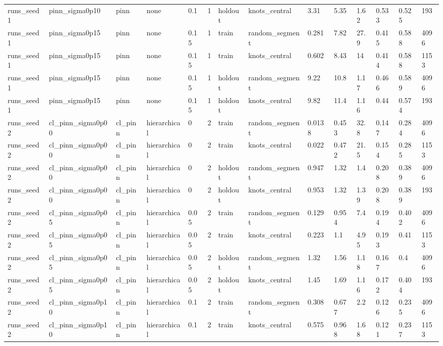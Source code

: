 \begin{table}[t]
\begin{tabular}{llllllllllllll}
runs\_seed1 & pinn\_sigma0p10 & pinn & none & 0.1 & 1 & holdout & knots\_central & 3.31 & 5.35 & 1.62 & 0.533 & 0.525 & 193 \\
runs\_seed1 & pinn\_sigma0p15 & pinn & none & 0.15 & 1 & train & random\_segment & 0.281 & 7.82 & 27.9 & 0.415 & 0.588 & 4096 \\
runs\_seed1 & pinn\_sigma0p15 & pinn & none & 0.15 & 1 & train & knots\_central & 0.602 & 8.43 & 14 & 0.414 & 0.588 & 1153 \\
runs\_seed1 & pinn\_sigma0p15 & pinn & none & 0.15 & 1 & holdout & random\_segment & 9.22 & 10.8 & 1.17 & 0.466 & 0.589 & 4096 \\
runs\_seed1 & pinn\_sigma0p15 & pinn & none & 0.15 & 1 & holdout & knots\_central & 9.82 & 11.4 & 1.16 & 0.44 & 0.574 & 193 \\
runs\_seed2 & cl\_pinn\_sigma0p00 & cl\_pinn & hierarchical & 0 & 2 & train & random\_segment & 0.0138 & 0.453 & 32.8 & 0.147 & 0.284 & 4096 \\
runs\_seed2 & cl\_pinn\_sigma0p00 & cl\_pinn & hierarchical & 0 & 2 & train & knots\_central & 0.022 & 0.472 & 21.5 & 0.154 & 0.285 & 1153 \\
runs\_seed2 & cl\_pinn\_sigma0p00 & cl\_pinn & hierarchical & 0 & 2 & holdout & random\_segment & 0.947 & 1.32 & 1.4 & 0.208 & 0.389 & 4096 \\
runs\_seed2 & cl\_pinn\_sigma0p00 & cl\_pinn & hierarchical & 0 & 2 & holdout & knots\_central & 0.953 & 1.32 & 1.39 & 0.208 & 0.389 & 193 \\
runs\_seed2 & cl\_pinn\_sigma0p05 & cl\_pinn & hierarchical & 0.05 & 2 & train & random\_segment & 0.129 & 0.954 & 7.4 & 0.194 & 0.402 & 4096 \\
runs\_seed2 & cl\_pinn\_sigma0p05 & cl\_pinn & hierarchical & 0.05 & 2 & train & knots\_central & 0.223 & 1.1 & 4.95 & 0.193 & 0.41 & 1153 \\
runs\_seed2 & cl\_pinn\_sigma0p05 & cl\_pinn & hierarchical & 0.05 & 2 & holdout & random\_segment & 1.32 & 1.56 & 1.18 & 0.167 & 0.4 & 4096 \\
runs\_seed2 & cl\_pinn\_sigma0p05 & cl\_pinn & hierarchical & 0.05 & 2 & holdout & knots\_central & 1.45 & 1.69 & 1.16 & 0.172 & 0.404 & 193 \\
runs\_seed2 & cl\_pinn\_sigma0p10 & cl\_pinn & hierarchical & 0.1 & 2 & train & random\_segment & 0.308 & 0.677 & 2.2 & 0.126 & 0.235 & 4096 \\
runs\_seed2 & cl\_pinn\_sigma0p10 & cl\_pinn & hierarchical & 0.1 & 2 & train & knots\_central & 0.575 & 0.968 & 1.68 & 0.121 & 0.237 & 1153 \\

\end{tabular}
\end{table}
